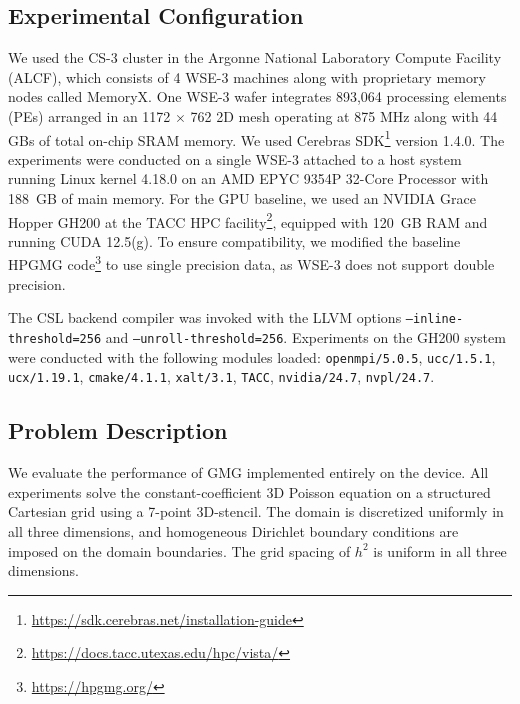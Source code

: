 \documentclass[sigconf]{acmart}
\begin{document}
\subsection{Experimental Configuration}
We used the CS-3 cluster in the Argonne National Laboratory Compute Facility (ALCF), which
consists of 4 WSE-3 machines along with proprietary memory nodes called MemoryX. %
One WSE-3 wafer integrates 893,064 processing elements (PEs) arranged in an 1172 $\times$ 762 2D mesh operating at 875 MHz along with 44 GBs of total on-chip SRAM memory. We used Cerebras SDK\footnote{\url{https://sdk.cerebras.net/installation-guide}} version 1.4.0. The experiments were conducted on a single WSE-3 %
attached to a host system running Linux kernel 4.18.0 on an AMD EPYC 9354P 32-Core Processor with 188~GB of main memory. For the GPU baseline, we used an NVIDIA Grace Hopper GH200 at the TACC HPC facility\footnote{\url{https://docs.tacc.utexas.edu/hpc/vista/}}, equipped with 120~GB RAM and running CUDA 12.5(g). To ensure compatibility, we modified the baseline HPGMG code\footnote{\url{https://hpgmg.org/}} to use single precision data, as WSE-3 does not support double precision.

The CSL backend compiler was invoked with the LLVM options
\texttt{--inline-threshold=256} and \texttt{--unroll-threshold=256}. Experiments on the GH200 system were conducted with the following modules loaded:
\texttt{openmpi/5.0.5}, \texttt{ucc/1.5.1}, \texttt{ucx/1.19.1},
\texttt{cmake/4.1.1}, \texttt{xalt/3.1}, \texttt{TACC},
\texttt{nvidia/24.7}, \texttt{nvpl/24.7}.



\subsection{Problem Description} 
We evaluate the performance of GMG %
implemented entirely on the device. All experiments solve the constant-coefficient 3D Poisson equation on a structured Cartesian grid using a 7-point 3D-stencil. The domain is discretized uniformly in all three dimensions, and homogeneous Dirichlet boundary conditions are imposed on the domain boundaries. The grid spacing of $h^2$ is uniform in all three dimensions. 
\end{document}
